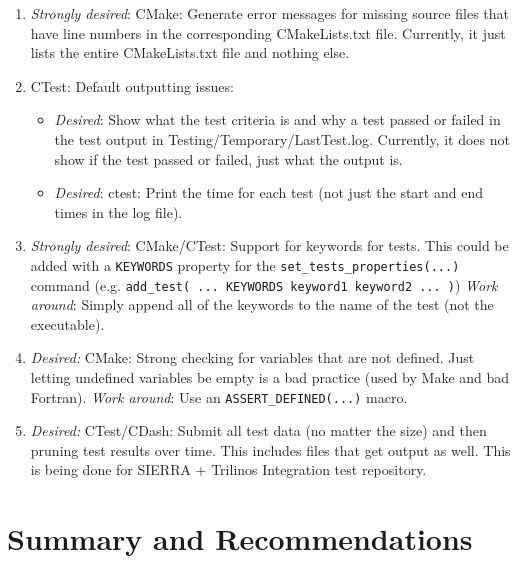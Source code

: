 \documentclass[pdf,ps2pdf,11pt]{SANDreport}
\begin{document}
\begin{enumerate}

{}\item\textit{Strongly desired}: CMake: Generate error messages for
missing source files that have line numbers in the corresponding
CMakeLists.txt file.  Currently, it just lists the entire
CMakeLists.txt file and nothing else.



{}\item CTest: Default outputting issues:

  \begin{itemize}

  {}\item\textit{Desired}: Show what the test criteria is and why a
  test passed or failed in the test output in
  Testing/Temporary/LastTest.log.  Currently, it does not show if the
  test passed or failed, just what the output is.
  
  {}\item\textit{Desired}: ctest: Print the time for each test (not
  just the start and end times in the log file).

  \end{itemize}

{}\item\textit{Strongly desired}: CMake/CTest: Support for keywords
for tests.  This could be added with a {}\texttt{KEYWORDS} property
for the {}\texttt{set\_tests\_properties(...)} command
(e.g. {}\texttt{add\_test( ... KEYWORDS keyword1 keyword2 ... )}) 
{}\textit{Work around}: Simply append all of the keywords to the name
of the test (not the executable).

{}\item\textit{Desired:} CMake: Strong checking for variables that are
not defined.  Just letting undefined variables be empty is a bad
practice (used by Make and bad Fortran). {}\textit{Work around}: Use
an {}\texttt{ASSERT\_DEFINED(...)} macro.

{}\item\textit{Desired:} CTest/CDash: Submit all test data (no matter
the size) and then pruning test results over time.  This includes
files that get output as well.  This is being done for SIERRA +
Trilinos Integration test repository.

\end{enumerate}


%
\section{Summary and Recommendations}
%
\end{document}

